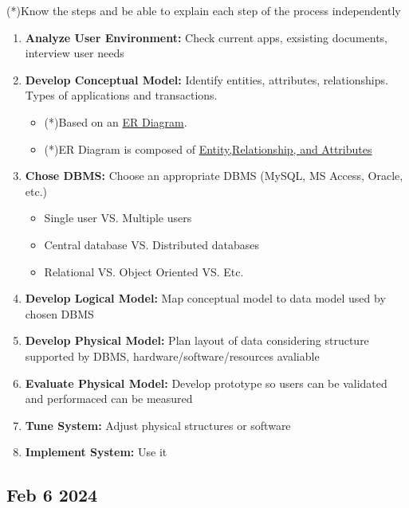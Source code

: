 \documentclass[12pt]{article}
\begin{document}
\begin{itemize}
					 (*)Know the steps and be able to explain each step of the process independently
					 \begin{enumerate}
								\item \textbf{Analyze User Environment:} Check current apps, exsisting documents,
										  interview user needs
								\item \textbf{Develop Conceptual Model:} Identify entities, attributes, relationships. 
										  Types of applications and transactions.
										  \begin{itemize}
													 \item (*)Based on an \underline{ER Diagram}.
													 \item (*)ER Diagram is composed of 
																\underline{Entity,Relationship, and Attributes}
										  \end{itemize}
								\item \textbf{Chose DBMS:} Choose an appropriate DBMS (MySQL, MS Access, Oracle, etc.)
										  \begin{itemize}
													 \item Single user VS. Multiple users
													 \item Central database VS. Distributed databases
													 \item Relational VS. Object Oriented VS. Etc. 
										  \end{itemize}
								\item \textbf{Develop Logical Model:} Map conceptual model to data model used by
										  chosen DBMS
								\item \textbf{Develop Physical Model:} Plan layout of data considering structure
										  supported by DBMS, hardware/software/resources avaliable
								\item \textbf{Evaluate Physical Model:} Develop prototype so users can be validated
										  and performaced can be measured
								\item \textbf{Tune System:} Adjust physical structures or software 
								\item \textbf{Implement System:} Use it
					 \end{enumerate}

\end{itemize}

\subsection*{Feb 6 2024}
\end{document}
